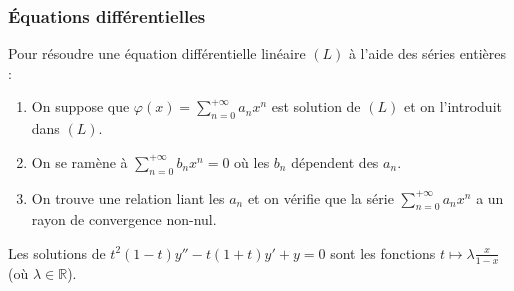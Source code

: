 	\subsubsection{Équations différentielles}


	\begin{proposition}
		Pour résoudre une équation différentielle linéaire $(L)$ à l'aide des séries entières :
		\begin{enumerate}
			\item On suppose que $\varphi(x) = \sum_{n=0}^{+\infty} a_n x^n$ est solution de $(L)$ et on l'introduit dans $(L)$.
			\item On se ramène à $\sum_{n=0}^{+\infty} b_nx^n = 0$ où les $b_n$ dépendent des $a_n$.
			\item On trouve une relation liant les $a_n$ et on vérifie que la série $\sum_{n=0}^{+\infty} a_n x^n$ a un rayon de convergence non-nul.
		\end{enumerate}
	\end{proposition}


	\begin{example}
		Les solutions de $t^2 (1-t) y'' - t (1+t) y' + y = 0$ sont les fonctions $t \mapsto \lambda \frac{x}{1-x}$ (où $\lambda \in \mathbb{R}$).
	\end{example}

